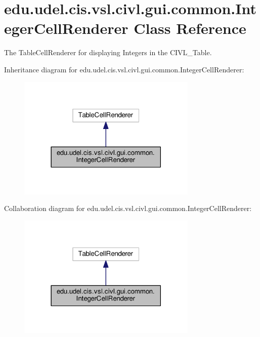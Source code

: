 \hypertarget{classedu_1_1udel_1_1cis_1_1vsl_1_1civl_1_1gui_1_1common_1_1IntegerCellRenderer}{}\section{edu.\+udel.\+cis.\+vsl.\+civl.\+gui.\+common.\+Integer\+Cell\+Renderer Class Reference}
\label{classedu_1_1udel_1_1cis_1_1vsl_1_1civl_1_1gui_1_1common_1_1IntegerCellRenderer}


The Table\+Cell\+Renderer for displaying Integers in the C\+I\+V\+L\+\_\+\+Table.  




Inheritance diagram for edu.\+udel.\+cis.\+vsl.\+civl.\+gui.\+common.\+Integer\+Cell\+Renderer\+:
\nopagebreak
\begin{figure}[H]
\begin{center}
\leavevmode
\includegraphics[width=242pt]{classedu_1_1udel_1_1cis_1_1vsl_1_1civl_1_1gui_1_1common_1_1IntegerCellRenderer__inherit__graph}
\end{center}
\end{figure}


Collaboration diagram for edu.\+udel.\+cis.\+vsl.\+civl.\+gui.\+common.\+Integer\+Cell\+Renderer\+:
\nopagebreak
\begin{figure}[H]
\begin{center}
\leavevmode
\includegraphics[width=242pt]{classedu_1_1udel_1_1cis_1_1vsl_1_1civl_1_1gui_1_1common_1_1IntegerCellRenderer__coll__graph}
\end{center}
\end{figure}
